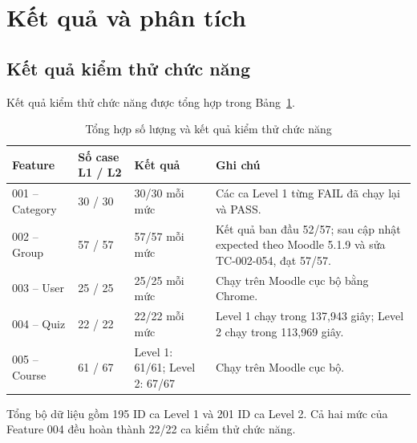 \section{Kết quả và phân tích}
\label{sec:results}

\subsection{Kết quả kiểm thử chức năng}
Kết quả kiểm thử chức năng được tổng hợp trong Bảng~\ref{tab:functional-results}.\cite{prj3source}

\begin{table}[H]
\centering
\caption{Tổng hợp số lượng và kết quả kiểm thử chức năng}
\label{tab:functional-results}
\small
\begin{tabular}{|p{2.1cm}|p{2.5cm}|p{2.1cm}|p{6.0cm}|}
\hline
\textbf{Feature} & \textbf{Số case L1 / L2} & \textbf{Kết quả} & \textbf{Ghi chú} \\
\hline
001 -- Category & 30 / 30 & 30/30 mỗi mức & Các ca Level 1 từng FAIL đã chạy lại và PASS. \\
\hline
002 -- Group & 57 / 57 & 57/57 mỗi mức & Kết quả ban đầu 52/57; sau cập nhật expected theo Moodle 5.1.9 và sửa TC-002-054, đạt 57/57. \\
\hline
003 -- User & 25 / 25 & 25/25 mỗi mức & Chạy trên Moodle cục bộ bằng Chrome. \\
\hline
004 -- Quiz & 22 / 22 & 22/22 mỗi mức & Level 1 chạy trong 137,943 giây; Level 2 chạy trong 113,969 giây. \\
\hline
005 -- Course & 61 / 67 & Level 1: 61/61; Level 2: 67/67 & Chạy trên Moodle cục bộ. \\
\hline
\end{tabular}
\end{table}

Tổng bộ dữ liệu gồm 195 ID ca Level 1 và 201 ID ca Level 2. Cả hai mức của Feature 004 đều hoàn thành 22/22 ca kiểm thử chức năng.

